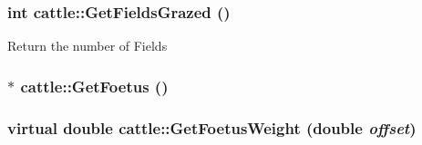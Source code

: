 \label{classcattle_ac087867a732ba9ae7821d1d61928908f}
\hypertarget{classcattle_a3166b570f41005f2806018d06d04bd0b}{
\subsubsection[{GetFieldsGrazed}]{\setlength{\rightskip}{0pt plus 5cm}int cattle::GetFieldsGrazed ()}}
\label{classcattle_a3166b570f41005f2806018d06d04bd0b}
Return the number of Fields \hypertarget{classcattle_ac37916ffd8ad3a51956838cf35a51e94}{
\subsubsection[{GetFoetus}]{$\ast$ cattle::GetFoetus ()}}
\label{classcattle_ac37916ffd8ad3a51956838cf35a51e94}
\hypertarget{classcattle_a46b5f1e591b420acb2e2ce0e69aef5fe}{
\subsubsection[{GetFoetusWeight}]{\setlength{\rightskip}{0pt plus 5cm}virtual double cattle::GetFoetusWeight (double {\em offset})}}
\label{classcattle_a46b5f1e591b420acb2e2ce0e69aef5fe}


